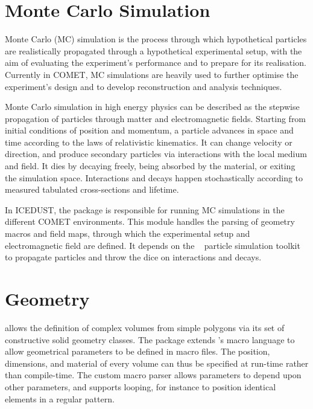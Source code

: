 \section{Monte Carlo Simulation}
Monte Carlo (MC) simulation is the process through which hypothetical particles are realistically propagated through a hypothetical experimental setup, with the aim of evaluating the experiment's performance and to prepare for its realisation. Currently in COMET, MC simulations are heavily used to further optimise the experiment's design and to develop reconstruction and analysis techniques.

Monte Carlo simulation in high energy physics can be described as the stepwise propagation of particles through matter and electromagnetic fields. Starting from initial conditions of position and momentum, a particle advances in space and time according to the laws of relativistic kinematics. It can change velocity or direction, and produce secondary particles via interactions with the local medium and field. It dies by decaying freely, being absorbed by the material, or exiting the simulation space.
Interactions and decays happen stochastically according to measured tabulated cross-sections and lifetime.



In ICEDUST, the \SimG package is responsible for running MC simulations in the different COMET environments. This module handles the parsing of geometry macros and field maps, through which the experimental setup and electromagnetic field are defined. It depends on the \Geant~\cite{AGOSTINELLI2003250} particle simulation toolkit to propagate particles and throw the dice on interactions and decays.

\section{Geometry}
\Geant allows the definition of complex volumes from simple polygons via its set of constructive solid geometry classes.
The \SimG package extends \Geant's macro language to allow geometrical parameters to be defined in macro files. The position, dimensions, and material of every volume can thus be specified at run-time rather than compile-time. The custom macro parser allows parameters to depend upon other parameters, and supports looping, for instance to position identical elements in a regular pattern.


